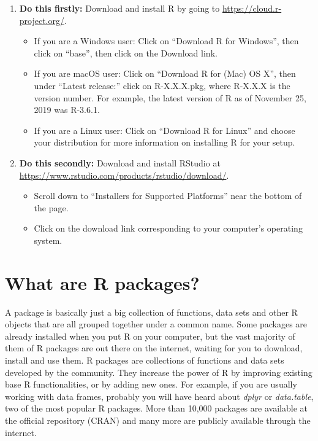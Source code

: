 \documentclass[
  12pt,
  oneside]{book}
\providecommand{\tightlist}{%
  \setlength{\itemsep}{0pt}\setlength{\parskip}{0pt}}
\begin{document}
\begin{enumerate}
\def\labelenumi{\arabic{enumi}.}
\tightlist
\item
  \textbf{Do this firstly:} Download and install R by going to \url{https://cloud.r-project.org/}. 

  \begin{itemize}
  \tightlist
  \item
    If you are a Windows user: Click on ``Download R for Windows'', then click on ``base'', then click on the Download link.
  \item
    If you are macOS user: Click on ``Download R for (Mac) OS X'', then under ``Latest release:'' click on R-X.X.X.pkg, where R-X.X.X is the version number. For example, the latest version of R as of November 25, 2019 was R-3.6.1.
  \item
    If you are a Linux user: Click on ``Download R for Linux'' and choose your distribution for more information on installing R for your setup.
  \end{itemize}
\item
  \textbf{Do this secondly:} Download and install RStudio at \url{https://www.rstudio.com/products/rstudio/download/}.

  \begin{itemize}
  \tightlist
  \item
    Scroll down to ``Installers for Supported Platforms'' near the bottom of the page.
  \item
    Click on the download link corresponding to your computer's operating system.
  \end{itemize}
\end{enumerate}

\hypertarget{packages}{%
\section{What are R packages?}\label{packages}}

A package is basically just a big collection of functions, data sets and other R objects that are all grouped together under a common name. Some packages are already installed when you put R on your computer, but the vast majority of them of R packages are out there on the internet, waiting for you to download, install and use them.
R packages are collections of functions and data sets developed by the community. They increase the power of R by improving existing base R functionalities, or by adding new ones. For example, if you are usually working with data frames, probably you will have heard about \emph{dplyr} or \emph{data.table}, two of the most popular R packages. More than 10,000 packages are available at the official repository (CRAN) and many more are publicly available through the internet.
\end{document}
